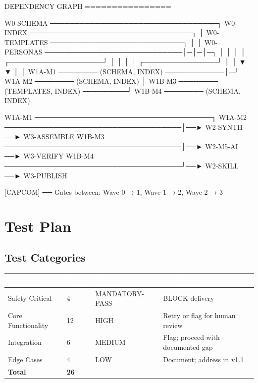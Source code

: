 \documentclass[11pt,letterpaper]{article}
\newcommand{\tableheader}[1]{\textbf{\sffamily\textcolor{white}{#1}}}
\begin{document}
\begin{asciibox}
DEPENDENCY GRAPH
================

W0-SCHEMA ──────────────────────────────────┐
W0-INDEX ─────────────────────────────────┐ │
W0-TEMPLATES ───────────────────────────┐ │ │
W0-PERSONAS ────────────────────────────│─│─│─┐
                                        │ │ │ │
                    ┌───────────────────┘ │ │ │
                    │     ┌───────────────┘ │ │
                    ▼     ▼                 │ │
W1A-M1 ──────── (SCHEMA, INDEX) ────────────│─┘
W1A-M2 ──────── (SCHEMA, INDEX)             │
W1B-M3 ──────── (TEMPLATES, INDEX) ─────────┘
W1B-M4 ──────── (SCHEMA, INDEX)

W1A-M1 ────────────────────────────────────┐
W1A-M2 ────────────────────────────────────│──► W2-SYNTH ──► W3-ASSEMBLE
W1B-M3 ────────────────────────────────────│──► W2-M5-AI ──► W3-VERIFY
W1B-M4 ────────────────────────────────────┘──► W2-SKILL ──► W3-PUBLISH

[CAPCOM] ── Gates between: Wave 0 → 1, Wave 1 → 2, Wave 2 → 3
\end{asciibox}

\section{Test Plan}

\subsection{Test Categories}

\begin{center}
\begin{tabularx}{\textwidth}{L{3cm}C{1.5cm}L{2.5cm}X}
\toprule
{}
\tableheader{Category} & \tableheader{Count} & \tableheader{Priority} & \tableheader{On Failure} \\
\midrule
Safety-Critical & 4 & MANDATORY-PASS & BLOCK delivery \\
Core Functionality & 12 & HIGH & Retry or flag for human review \\
Integration & 6 & MEDIUM & Flag; proceed with documented gap \\
Edge Cases & 4 & LOW & Document; address in v1.1 \\
\midrule
\textbf{Total} & \textbf{26} & & \\
\bottomrule
\end{tabularx}
\end{center}
\end{document}
